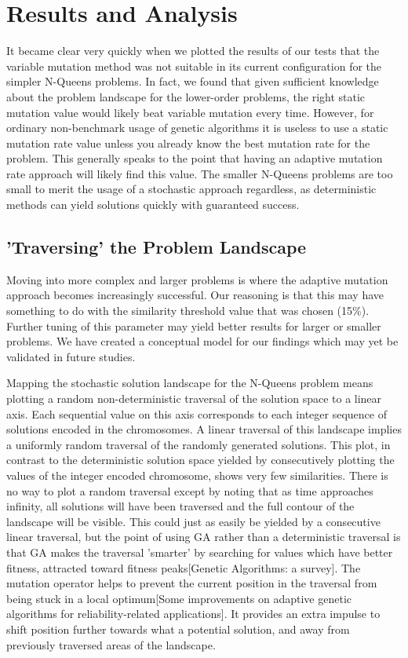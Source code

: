 \documentclass{sig-alternate}
\begin{document}
% 
%
\newpage
\section{Results and Analysis}
It became clear very quickly when we plotted the results of our tests that the variable mutation method was not suitable in its current configuration for the simpler N-Queens problems. In fact, we found that given sufficient knowledge about the problem landscape for the lower-order problems, the right static mutation value would likely beat variable mutation every time. However, for ordinary non-benchmark usage of genetic algorithms it is useless to use a static mutation rate value unless you already know the best mutation rate for the problem. This generally speaks to the point that having an adaptive mutation rate approach will likely find this value. The smaller N-Queens problems are too small to merit the usage of a stochastic approach regardless, as deterministic methods can yield solutions quickly with guaranteed success.

\subsection{'Traversing' the Problem Landscape}
Moving into more complex and larger problems is where the adaptive mutation approach becomes increasingly successful. Our reasoning is that this may have something to do with the similarity threshold value that was chosen (15\%). Further tuning of this parameter may yield better results for larger or smaller problems. We have created a conceptual model for our findings which may yet be validated in future studies.

Mapping the stochastic solution landscape for the N-Queens problem means plotting a random non-deterministic traversal of the solution space to a linear axis. Each sequential value on this axis corresponds to each integer sequence of solutions encoded in the chromosomes. A linear traversal of this landscape implies a uniformly random traversal of the randomly generated solutions. This plot, in contrast to the deterministic solution space yielded by consecutively plotting the values of the integer encoded chromosome, shows very few similarities. There is no way to plot a random traversal except by noting that as time approaches infinity, all solutions will have been traversed and the full contour of the landscape will be visible. This could just as easily be yielded by a consecutive linear traversal, but the point of using GA rather than a deterministic traversal is that GA makes the traversal 'smarter' by searching for values which have better fitness, attracted toward fitness peaks[Genetic Algorithms: a survey]. The mutation operator helps to prevent the current position in the traversal from being stuck in a local optimum[Some improvements on adaptive genetic algorithms for reliability-related applications]. It provides an extra impulse to shift position further towards what a potential solution, and away from previously traversed areas of the landscape.
\end{document}
